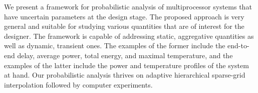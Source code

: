 We present a framework for probabilistic analysis of multiprocessor systems that
have uncertain parameters at the design stage. The proposed approach is very
general and suitable for studying various quantities that are of interest for
the designer. The framework is capable of addressing static, aggregative
quantities as well as dynamic, transient ones. The examples of the former
include the end-to-end delay, average power, total energy, and maximal
temperature, and the examples of the latter include the power and temperature
profiles of the system at hand. Our probabilistic analysis thrives on adaptive
hierarchical sparse-grid interpolation followed by computer experiments.
